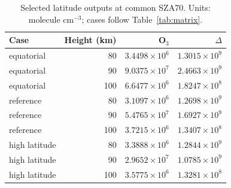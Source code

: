 \begin{table}[htbp]\centering\small\caption{Selected latitude outputs at common SZA70. Units: molecule cm$^{-3}$; cases follow Table~\ref{tab:matrix}.}\label{tab:latitude}\begin{tabular}{lrrr}\toprule Case & Height (km) & O$_3$ & $\Delta$\\\midrule
equatorial & 80 & $3.4498\times10^{6}$ & $1.3015\times10^{9}$\\
equatorial & 90 & $9.0375\times10^{7}$ & $2.4663\times10^{9}$\\
equatorial & 100 & $6.6477\times10^{6}$ & $1.8247\times10^{8}$\\
reference & 80 & $3.1097\times10^{6}$ & $1.2698\times10^{9}$\\
reference & 90 & $5.4765\times10^{7}$ & $1.6927\times10^{9}$\\
reference & 100 & $3.7215\times10^{6}$ & $1.3407\times10^{8}$\\
high latitude & 80 & $3.3888\times10^{6}$ & $1.2844\times10^{9}$\\
high latitude & 90 & $2.9652\times10^{7}$ & $1.0785\times10^{9}$\\
high latitude & 100 & $3.5775\times10^{6}$ & $1.3281\times10^{8}$\\\bottomrule\end{tabular}\end{table}
